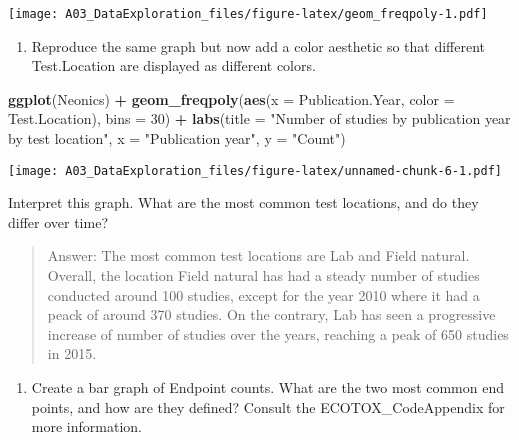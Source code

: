 \documentclass[
]{article}
\newenvironment{Shaded}{\begin{snugshade}}{\end{snugshade}}
\newcommand{\DataTypeTok}[1]{\textcolor[rgb]{0.13,0.29,0.53}{#1}}
\newcommand{\DecValTok}[1]{\textcolor[rgb]{0.00,0.00,0.81}{#1}}
\newcommand{\KeywordTok}[1]{\textcolor[rgb]{0.13,0.29,0.53}{\textbf{#1}}}
\newcommand{\NormalTok}[1]{#1}
\newcommand{\OperatorTok}[1]{\textcolor[rgb]{0.81,0.36,0.00}{\textbf{#1}}}
\newcommand{\StringTok}[1]{\textcolor[rgb]{0.31,0.60,0.02}{#1}}
\providecommand{\tightlist}{%
  \setlength{\itemsep}{0pt}\setlength{\parskip}{0pt}}
\begin{document}
\texttt{[image: A03\_DataExploration\_files/figure-latex/geom\_freqpoly-1.pdf]}

\begin{enumerate}
\def\labelenumi{\arabic{enumi}.}
\setcounter{enumi}{9}
\tightlist
\item
  Reproduce the same graph but now add a color aesthetic so that
  different Test.Location are displayed as different colors.
\end{enumerate}

\begin{Shaded}
\begin{Highlighting}[]
\KeywordTok{ggplot}\NormalTok{(Neonics) }\OperatorTok{+}
\StringTok{  }\KeywordTok{geom_freqpoly}\NormalTok{(}\KeywordTok{aes}\NormalTok{(}\DataTypeTok{x =}\NormalTok{ Publication.Year, }\DataTypeTok{color =}\NormalTok{ Test.Location), }\DataTypeTok{bins =} \DecValTok{30}\NormalTok{) }\OperatorTok{+}
\StringTok{  }\KeywordTok{labs}\NormalTok{(}\DataTypeTok{title =} \StringTok{"Number of studies by publication year by test location"}\NormalTok{, }\DataTypeTok{x =} \StringTok{"Publication year"}\NormalTok{, }\DataTypeTok{y =} \StringTok{"Count"}\NormalTok{)}
\end{Highlighting}
\end{Shaded}

\texttt{[image: A03\_DataExploration\_files/figure-latex/unnamed-chunk-6-1.pdf]}

Interpret this graph. What are the most common test locations, and do
they differ over time?

\begin{quote}
Answer: The most common test locations are Lab and Field natural.
Overall, the location Field natural has had a steady number of studies
conducted around 100 studies, except for the year 2010 where it had a
peack of around 370 studies. On the contrary, Lab has seen a progressive
increase of number of studies over the years, reaching a peak of 650
studies in 2015.
\end{quote}

\begin{enumerate}
\def\labelenumi{\arabic{enumi}.}
\setcounter{enumi}{10}
\tightlist
\item
  Create a bar graph of Endpoint counts. What are the two most common
  end points, and how are they defined? Consult the ECOTOX\_CodeAppendix
  for more information.
\end{enumerate}
\end{document}
